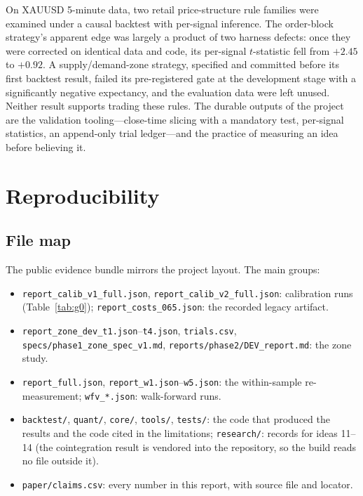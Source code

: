 \documentclass[11pt,a4paper]{article}
\begin{document}
On XAUUSD 5-minute data, two retail price-structure rule families were examined under a causal
backtest with per-signal inference. The order-block strategy's apparent edge was largely a
product of two harness defects: once they were corrected on identical data and code, its
per-signal $t$-statistic fell from $+2.45$ to $+0.92$. A supply/demand-zone strategy, specified
and committed before its first backtest result, failed its pre-registered gate at the development stage with a
significantly negative expectancy, and the evaluation data were left unused. Neither result
supports trading these rules. The durable outputs of the project are the validation tooling---close-time
slicing with a mandatory test, per-signal statistics, an append-only trial ledger---and the
practice of measuring an idea before believing it.

\FloatBarrier



\appendix
\section{Reproducibility}
\label{app:repro}

\subsection{File map}
The public evidence bundle mirrors the project layout. The main groups:
\begin{itemize}[before=\raggedright]
\item \texttt{report\_calib\_v1\_full.json}, \texttt{report\_calib\_v2\_full.json}: calibration
runs (Table~\ref{tab:g0}); \texttt{report\_costs\_065.json}: the recorded legacy artifact.
\item \texttt{report\_zone\_dev\_t1.json}--\texttt{t4.json}, \texttt{trials.csv},
\texttt{specs/phase1\_zone\_spec\_v1.md}, \texttt{reports/phase2/DEV\_report.md}: the zone study.
\item \texttt{report\_full.json}, \texttt{report\_w1.json}--\texttt{w5.json}: the within-sample
re-measurement; \texttt{wfv\_*.json}: walk-forward runs.
\item \texttt{backtest/}, \texttt{quant/}, \texttt{core/}, \texttt{tools/}, \texttt{tests/}: the
code that produced the results and the code cited in the limitations; \texttt{research/}: records for ideas 11--14 (the cointegration result is vendored into
the repository, so the build reads no file outside it).
\item \texttt{paper/claims.csv}: every number in this report, with source file and locator.
\end{itemize}
\end{document}
